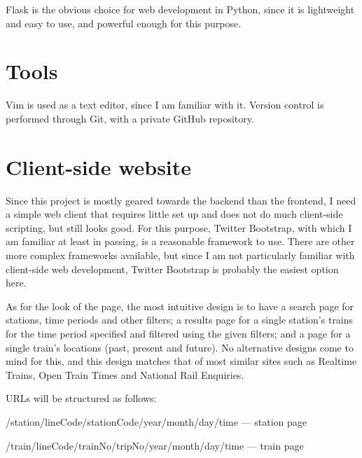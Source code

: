 \documentclass[a4paper,12pt]{report}
\begin{document}
Flask is the obvious choice for web development in Python, since it is
lightweight and easy to use, and powerful enough for this purpose.

\section{Tools}

Vim is used as a text editor, since I am familiar with it. Version control is
performed through Git, with a private GitHub repository.

\section{Client-side website}

Since this project is mostly geared towards the backend than the frontend, I
need a simple web client that requires little set up and does not do much
client-side scripting, but still looks good. For this purpose, Twitter
Bootstrap, with which I am familiar at least in passing, is a reasonable
framework to use. There are other more complex frameworks available, but since
I am not particularly familiar with client-side web development, Twitter
Bootstrap is probably the easiest option here.

As for the look of the page, the most intuitive design is to have a search page
for stations, time periods and other filters; a results page for a single
station's trains for the time period specified and filtered using the given
filters; and a page for a single train's locations (past, present and future).
No alternative designs come to mind for this, and this design matches that of
most similar sites such as Realtime Trains, Open Train Times and National Rail
Enquiries.

URLs will be structured as follows:

/station/lineCode/stationCode/year/month/day/time --- station page

/train/lineCode/trainNo/tripNo/year/month/day/time --- train page
\end{document}
